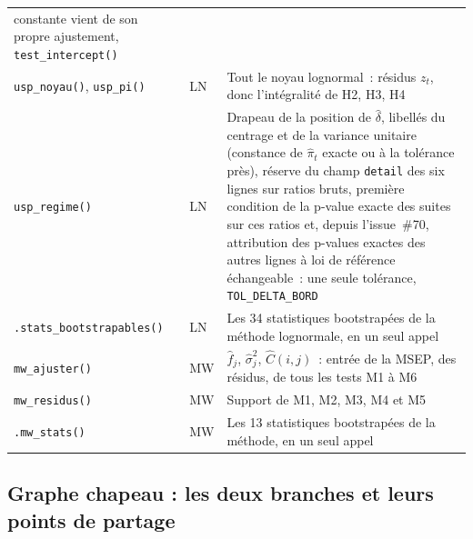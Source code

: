 \documentclass[a4paper,11pt]{article}
\newcommand{\code}[1]{\texttt{\small #1}}
\begin{document}
\begin{center}
\begin{tabular}{@{}p{4.4cm}p{1.9cm}p{8.5cm}@{}}
constante vient de son propre ajustement, \code{test\_intercept()} \\
\code{usp\_noyau()}, \code{usp\_pi()} & LN & Tout le noyau lognormal~:
résidus $z_t$, donc l'intégralité de H2, H3, H4 \\
\code{usp\_regime()} & LN & Drapeau de la position de $\hat\delta$, libellés du
centrage et de la variance unitaire (constance de $\hat\pi_t$ exacte ou à la
tolérance près), réserve du champ \code{detail} des six
lignes sur ratios bruts, première condition de la p-value exacte des suites sur ces ratios et,
depuis l'issue~\#70, attribution des p-values exactes des autres lignes à loi de référence
échangeable~: une seule tolérance, \code{TOL\_DELTA\_BORD} \\
\code{.stats\_bootstrapables()} & LN & Les 34 statistiques bootstrapées de la
méthode lognormale, en un seul appel \\
\code{mw\_ajuster()} & MW & $\hat f_j$, $\hat\sigma_j^2$, $\hat C(i,j)$~: entrée
de la MSEP, des résidus, de tous les tests M1 à M6 \\
\code{mw\_residus()} & MW & Support de M1, M2, M3, M4 et M5 \\
\code{.mw\_stats()} & MW & Les 13 statistiques bootstrapées de la méthode, en un
seul appel \\
\end{tabular}
\end{center}

\newpage
\subsection{Graphe chapeau : les deux branches et leurs points de partage}
\end{document}
